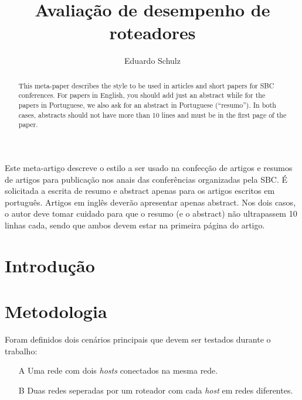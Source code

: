 \documentclass[12pt]{article}
\title{Avaliação de desempenho de roteadores}
\author{Eduardo Schulz\inst{1}}
\begin{document}
 

\maketitle

\begin{abstract}
  This meta-paper describes the style to be used in articles and short papers
  for SBC conferences. For papers in English, you should add just an abstract
  while for the papers in Portuguese, we also ask for an abstract in
  Portuguese (``resumo''). In both cases, abstracts should not have more than
  10 lines and must be in the first page of the paper.
\end{abstract}
     
\begin{resumo} 
  Este meta-artigo descreve o estilo a ser usado na confecção de artigos e
  resumos de artigos para publicação nos anais das conferências organizadas
  pela SBC. É solicitada a escrita de resumo e abstract apenas para os artigos
  escritos em português. Artigos em inglês deverão apresentar apenas abstract.
  Nos dois casos, o autor deve tomar cuidado para que o resumo (e o abstract)
  não ultrapassem 10 linhas cada, sendo que ambos devem estar na primeira
  página do artigo.
\end{resumo}


\section{Introdução}




\section{Metodologia}
Foram definidos dois cenários principais que devem ser testados durante o trabalho:
\begin{enumerate}
	\item[A] Uma rede com dois \textit{hosts} conectados na mesma rede.
	\item[B] Duas redes seperadas por um roteador com cada \textit{host} em redes diferentes. 
\end{enumerate}
\end{document}
